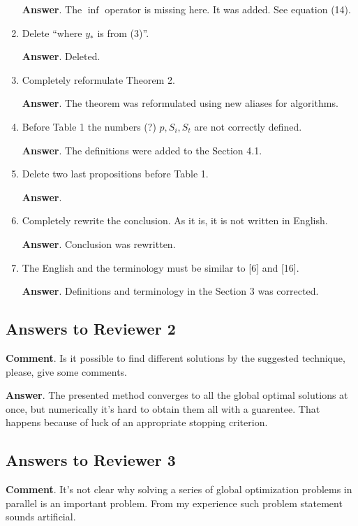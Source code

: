 \documentclass{article}%
\begin{document}
\begin{enumerate}
\textbf{Answer}.
The $\inf$ operator is missing here. It was added. See equation (14).

\item  Delete “where $y_*$ is from (3)”.

\textbf{Answer}.
Deleted.

\item  Completely reformulate Theorem 2.

\textbf{Answer}.
The theorem was reformulated using new aliases for algorithms.

\item  Before Table 1 the numbers (?) $p, S_i, S_t$ are not correctly defined.

\textbf{Answer}.
The definitions were added to the Section 4.1.

\item  Delete two last propositions before Table 1.

\textbf{Answer}.

\item  Completely rewrite the conclusion. As it is, it is not written in English.

\textbf{Answer}.
Conclusion was rewritten.

\item  The English and the terminology must be similar to [6] and [16].

\textbf{Answer}.
Definitions and terminology in the Section 3 was corrected.

\end{enumerate}



\subsection*{Answers to Reviewer 2}

\textbf{Comment}. Is it possible to find different solutions by the suggested technique, please, give some comments.

\textbf{Answer}.
The presented method converges to all the global optimal solutions at once, but numerically it's hard
to obtain them all with a guarentee. That happens because of luck of an appropriate stopping criterion.


\subsection*{Answers to Reviewer 3}

\textbf{Comment}. It's not clear why solving a series of global optimization problems in parallel is an important problem. From my experience such problem statement sounds artificial.
\end{document}
